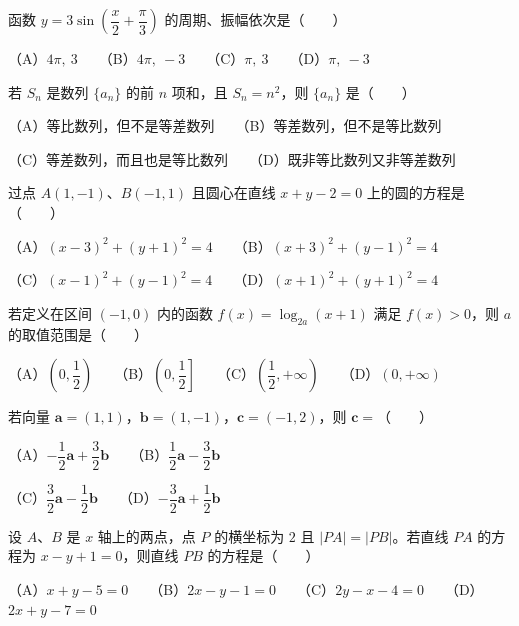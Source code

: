 \begin{question}
函数 $y=3\sin\left(\dfrac{x}{2}+\dfrac\pi3\right)$ 的周期、振幅依次是\mbox{（　　）}

（A）$4\pi,\ 3$　　（B）$4\pi,\ -3$　　（C）$\pi,\ 3$　　（D）$\pi,\ -3$

\end{question}
\begin{question}
若 $S_n$ 是数列 $\{a_n\}$ 的前 $n$ 项和，且 $S_n=n^2$，则 $\{a_n\}$ 是\mbox{（　　）}

（A）等比数列，但不是等差数列　　（B）等差数列，但不是等比数列

（C）等差数列，而且也是等比数列　　（D）既非等比数列又非等差数列

\end{question}
\begin{question}
过点 $A(1,-1)$、$B(-1,1)$ 且圆心在直线 $x+y-2=0$ 上的圆的方程是\mbox{（　　）}

（A）$(x-3)^2+(y+1)^2=4$　　（B）$(x+3)^2+(y-1)^2=4$

（C）$(x-1)^2+(y-1)^2=4$　　（D）$(x+1)^2+(y+1)^2=4$

\end{question}
\begin{question}
若定义在区间 $(-1,0)$ 内的函数 $f(x)=\log_{2a}(x+1)$ 满足 $f(x)>0$，则 $a$ 的取值范围是\mbox{（　　）}

（A）$\left(0,\dfrac12\right)$　　（B）$\left(0,\dfrac12\right]$　　（C）$\left(\dfrac12,+\infty\right)$　　（D）$(0,+\infty)$

\end{question}
\begin{question}
若向量 $\boldsymbol a=(1,1)$，$\boldsymbol b=(1,-1)$，$\boldsymbol c=(-1,2)$，则 $\boldsymbol c=$\mbox{（　　）}

（A）$-\dfrac12\boldsymbol a+\dfrac32\boldsymbol b$　　（B）$\dfrac12\boldsymbol a-\dfrac32\boldsymbol b$

（C）$\dfrac32\boldsymbol a-\dfrac12\boldsymbol b$　　（D）$-\dfrac32\boldsymbol a+\dfrac12\boldsymbol b$

\end{question}
\begin{question}
设 $A$、$B$ 是 $x$ 轴上的两点，点 $P$ 的横坐标为 $2$ 且 $|PA|=|PB|$。若直线 $PA$ 的方程为 $x-y+1=0$，则直线 $PB$ 的方程是\mbox{（　　）}

（A）$x+y-5=0$　　（B）$2x-y-1=0$　　（C）$2y-x-4=0$　　（D）$2x+y-7=0$

\end{question}
